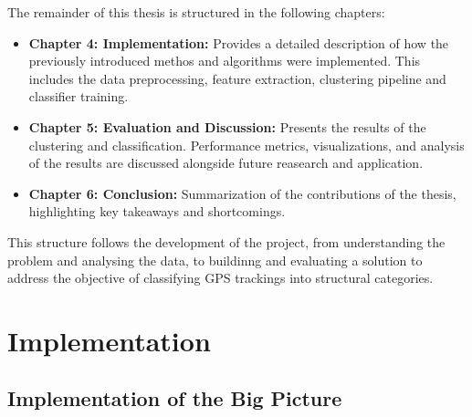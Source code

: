 \documentclass[a4paper,12pt,twoside]{scrreprt}
\begin{document}
The remainder of this thesis is structured in the following chapters:

\begin{itemize}
  \item \textbf{Chapter 4: Implementation:} Provides a detailed description of
        how the previously introduced methos and algorithms were implemented.
        This
        includes the data preprocessing, feature extraction, clustering
        pipeline and
        classifier training.
  \item \textbf{Chapter 5: Evaluation and Discussion:} Presents the results of
        the clustering and classification. Performance metrics, visualizations,
        and
        analysis of the results are discussed alongside future reasearch and
        application.
  \item \textbf{Chapter 6: Conclusion:} Summarization of the contributions of
        the thesis, highlighting key takeaways and shortcomings.
\end{itemize}

This structure follows the development of the project, from understanding the
problem and analysing the data, to buildinng and evaluating a solution to
address the objective of classifying GPS trackings into structural categories.
\chapter{Implementation}

\section{Implementation of the Big Picture}







\end{document}
